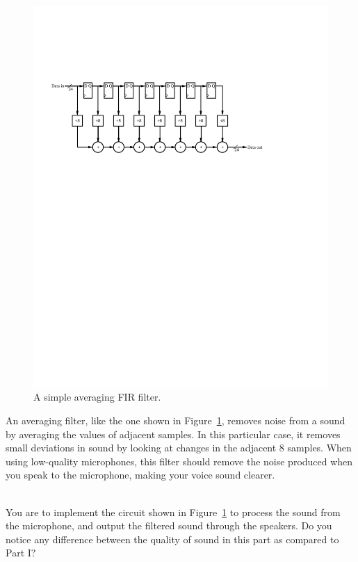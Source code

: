 \documentclass[epsfig,10pt,fullpage]{article}
\begin{document}
\begin{figure}[H]
\centering
\includegraphics{figures/eight_tap_fir_filter.pdf}
\caption{A simple averaging FIR filter.}
\label{fig:eight_tap_fir_filter}
\end{figure}

An averaging filter, like the one shown in Figure~\ref{fig:eight_tap_fir_filter}, removes noise from a sound by averaging the values of
adjacent samples. In this particular case, it removes small deviations in sound by looking at changes in the adjacent 8 samples.
When using low-quality microphones, this filter should remove the noise produced when you speak to the microphone, making your voice sound clearer.

~\\
You are to implement the circuit shown in Figure~\ref{fig:eight_tap_fir_filter} to process the sound from the microphone, and output the filtered sound
through the speakers. Do you notice any difference between the quality of sound in this part as compared to Part I?
\end{document}
